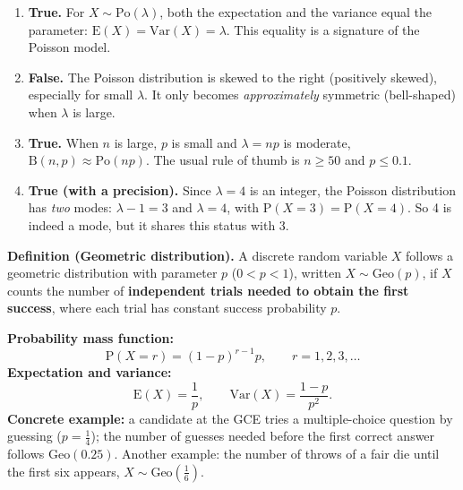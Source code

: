 \documentclass[11pt]{article}
\newcommand{\cle}[1]{{\popxbold\color{popdark}#1}}
\begin{document}
\begin{corrige}
\begin{enumerate}
\item \textbf{True.} For $X \sim \mathrm{Po}(\lambda)$, both the expectation and the variance equal the parameter: $\mathrm{E}(X) = \mathrm{Var}(X) = \lambda$. This equality is a signature of the Poisson model.
\item \textbf{False.} The Poisson distribution is skewed to the right (positively skewed), especially for small $\lambda$. It only becomes \emph{approximately} symmetric (bell-shaped) when $\lambda$ is large.
\item \textbf{True.} When $n$ is large, $p$ is small and $\lambda = np$ is moderate, $\mathrm{B}(n,p) \approx \mathrm{Po}(np)$. The usual rule of thumb is $n \ge 50$ and $p \le 0.1$.
\item \textbf{True (with a precision).} Since $\lambda = 4$ is an integer, the Poisson distribution has \emph{two} modes: $\lambda - 1 = 3$ and $\lambda = 4$, with $\mathrm{P}(X = 3) = \mathrm{P}(X = 4)$. So 4 is indeed a mode, but it shares this status with 3.
\end{enumerate}
\end{corrige}

\begin{corrige}
\textbf{Definition (Geometric distribution).} A discrete random variable $X$ follows a \cle{geometric distribution} with parameter $p$ ($0 < p < 1$), written $X \sim \mathrm{Geo}(p)$, if $X$ counts the number of \textbf{independent trials needed to obtain the first success}, where each trial has constant success probability $p$.

\textbf{Probability mass function:}
\[ \mathrm{P}(X = r) = (1-p)^{r-1} p, \qquad r = 1, 2, 3, \dots \]
\textbf{Expectation and variance:}
\[ \mathrm{E}(X) = \frac{1}{p}, \qquad \mathrm{Var}(X) = \frac{1-p}{p^{2}}. \]
\textbf{Concrete example:} a candidate at the GCE tries a multiple-choice question by guessing ($p = \tfrac{1}{4}$); the number of guesses needed before the first correct answer follows $\mathrm{Geo}(0.25)$. Another example: the number of throws of a fair die until the first six appears, $X \sim \mathrm{Geo}\!\left(\tfrac{1}{6}\right)$.
\end{corrige}
\end{document}
